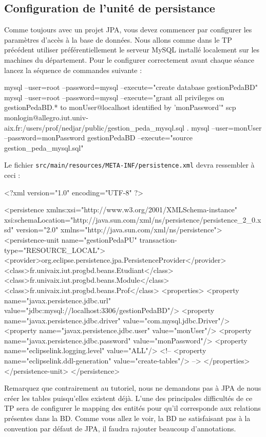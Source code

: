 \documentclass[a4paper,11pt]{article}
\begin{document}
\subsection{Configuration de l'unité de persistance}
Comme toujours avec un projet JPA, vous devez commencer par configurer les paramètres d'accès à la base de données.
Nous allons comme dans le TP précédent utiliser préférentiellement le serveur MySQL installé localement sur les machines 
du département. Pour le configurer correctement avant chaque séance lancez la séquence de commandes suivante :
\begin{code_shell}
mysql --user=root --password=mysql --execute="create database gestionPedaBD"
mysql --user=root --password=mysql --execute="grant all privileges on gestionPedaBD.* to monUser@localhost identified by 'monPassword'"
scp monlogin@allegro.iut.univ-aix.fr:/users/prof/nedjar/public/gestion_peda_mysql.sql .
mysql --user=monUser --password=monPassword gestionPedaBD --execute="source gestion_peda_mysql.sql"
\end{code_shell}

Le fichier \texttt{src/main/resources/META-INF/persistence.xml} devra ressembler à ceci :
\begin{code_xml}
<?xml version="1.0" encoding="UTF-8" ?>

<persistence xmlns:xsi="http://www.w3.org/2001/XMLSchema-instance" 
  xsi:schemaLocation="http://java.sun.com/xml/ns/persistence/persistence_2_0.xsd" 
  version="2.0" xmlns="http://java.sun.com/xml/ns/persistence">
  <persistence-unit name="gestionPedaPU" transaction-type="RESOURCE_LOCAL">
    <provider>org.eclipse.persistence.jpa.PersistenceProvider</provider>
	<class>fr.univaix.iut.progbd.beans.Etudiant</class>
	<class>fr.univaix.iut.progbd.beans.Module</class>
	<class>fr.univaix.iut.progbd.beans.Prof</class>
    <properties>
      <property name="javax.persistence.jdbc.url" value="jdbc:mysql://localhost:3306/gestionPedaBD"/>
      <property name="javax.persistence.jdbc.driver" value="com.mysql.jdbc.Driver"/>
      <property name="javax.persistence.jdbc.user"  value="monUser"/>
      <property name="javax.persistence.jdbc.password"  value="monPassword"/>
      <property name="eclipselink.logging.level" value="ALL"/>
<!--  <property name="eclipselink.ddl-generation"  value="create-tables"/> -->
    </properties>
  </persistence-unit>
</persistence>
\end{code_xml}
Remarquez que contrairement au tutoriel, nous ne demandons pas à JPA de nous créer les tables puisqu'elles existent déjà.
L'une des principales difficultés de ce TP sera de configurer le mapping des entités pour qu'il corresponde aux relations 
présentes dans la BD. Comme vous allez le voir, la BD ne satisfaisant pas à la convention par défaut de JPA,
il faudra rajouter beaucoup d'annotations.
\end{document}
